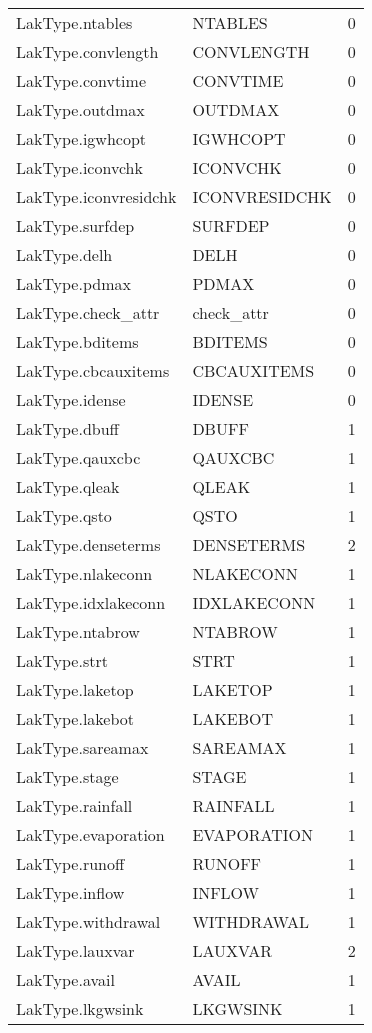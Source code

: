 \begin{longtable}{p{6cm} p{4cm} p{2cm} }
LakType.ntables &  NTABLES & 0 \\ 
LakType.convlength &  CONVLENGTH & 0 \\ 
LakType.convtime &  CONVTIME & 0 \\ 
LakType.outdmax &  OUTDMAX & 0 \\ 
LakType.igwhcopt &  IGWHCOPT & 0 \\ 
LakType.iconvchk &  ICONVCHK & 0 \\ 
LakType.iconvresidchk &  ICONVRESIDCHK & 0 \\ 
LakType.surfdep &  SURFDEP & 0 \\ 
LakType.delh &  DELH & 0 \\ 
LakType.pdmax &  PDMAX & 0 \\ 
LakType.check\_attr &  check\_attr & 0 \\ 
LakType.bditems &  BDITEMS & 0 \\ 
LakType.cbcauxitems &  CBCAUXITEMS & 0 \\ 
LakType.idense &  IDENSE & 0 \\ 
LakType.dbuff &  DBUFF & 1 \\ 
LakType.qauxcbc &  QAUXCBC & 1 \\ 
LakType.qleak &  QLEAK & 1 \\ 
LakType.qsto &  QSTO & 1 \\ 
LakType.denseterms &  DENSETERMS & 2 \\ 
LakType.nlakeconn &  NLAKECONN & 1 \\ 
LakType.idxlakeconn &  IDXLAKECONN & 1 \\ 
LakType.ntabrow &  NTABROW & 1 \\ 
LakType.strt &  STRT & 1 \\ 
LakType.laketop &  LAKETOP & 1 \\ 
LakType.lakebot &  LAKEBOT & 1 \\ 
LakType.sareamax &  SAREAMAX & 1 \\ 
LakType.stage &  STAGE & 1 \\ 
LakType.rainfall &  RAINFALL & 1 \\ 
LakType.evaporation &  EVAPORATION & 1 \\ 
LakType.runoff &  RUNOFF & 1 \\ 
LakType.inflow &  INFLOW & 1 \\ 
LakType.withdrawal &  WITHDRAWAL & 1 \\ 
LakType.lauxvar &  LAUXVAR & 2 \\ 
LakType.avail &  AVAIL & 1 \\ 
LakType.lkgwsink &  LKGWSINK & 1 \\ 

\end{longtable}
